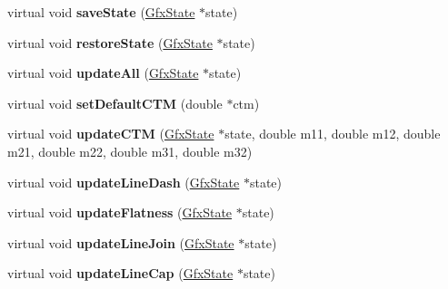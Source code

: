 \begin{DoxyCompactItemize}
virtual void {\bfseries save\+State} (\hyperlink{class_gfx_state}{Gfx\+State} $\ast$state)
\item 
\mbox{\label{class_cairo_output_dev_a3c30963cbacf1574042a21b2f92fefff}} 
virtual void {\bfseries restore\+State} (\hyperlink{class_gfx_state}{Gfx\+State} $\ast$state)
\item 
\mbox{\label{class_cairo_output_dev_ab94809ec14239f2e7291fd7f6d662dfb}} 
virtual void {\bfseries update\+All} (\hyperlink{class_gfx_state}{Gfx\+State} $\ast$state)
\item 
\mbox{\label{class_cairo_output_dev_a7a7a6b5c8389a96aa4998df5461be39c}} 
virtual void {\bfseries set\+Default\+C\+TM} (double $\ast$ctm)
\item 
\mbox{\label{class_cairo_output_dev_a9f920e3354798a0468a26ca641b762f6}} 
virtual void {\bfseries update\+C\+TM} (\hyperlink{class_gfx_state}{Gfx\+State} $\ast$state, double m11, double m12, double m21, double m22, double m31, double m32)
\item 
\mbox{\label{class_cairo_output_dev_a61ad33c984a0f7f5a39a6fc82bdd895d}} 
virtual void {\bfseries update\+Line\+Dash} (\hyperlink{class_gfx_state}{Gfx\+State} $\ast$state)
\item 
\mbox{\label{class_cairo_output_dev_a49d02febbf1ff0aa5218a1cbb244bea5}} 
virtual void {\bfseries update\+Flatness} (\hyperlink{class_gfx_state}{Gfx\+State} $\ast$state)
\item 
\mbox{\label{class_cairo_output_dev_acdd2e156b767acd6a4be519f91608cec}} 
virtual void {\bfseries update\+Line\+Join} (\hyperlink{class_gfx_state}{Gfx\+State} $\ast$state)
\item 
\mbox{\label{class_cairo_output_dev_accdc8d47a628d8029d8013fa6d163f59}} 
virtual void {\bfseries update\+Line\+Cap} (\hyperlink{class_gfx_state}{Gfx\+State} $\ast$state)
\item 
\mbox{\label{class_cairo_output_dev_ae06a4bb0a5cddc0164d4007cda2c78ff}} 

\end{DoxyCompactItemize}
